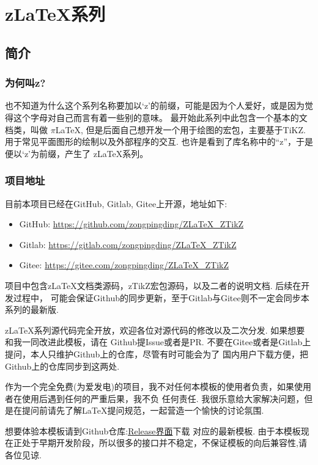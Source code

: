 \chapter{z\LaTeX{}系列}
\section{简介}
\subsection{为何叫z?}
也不知道为什么这个系列名称要加以`z'的前缀，可能是因为个人爱好，或是因为觉得这个字母对自己而言有着一些别的意味。
最开始此系列中此包含一个基本的文档类，叫做 $\pi$\LaTeX{}, 但是后面自己想开发一个用于绘图的宏包，主要基于TiKZ.
用于常见平面图形的绘制以及外部程序的交互. 也许是看到了库名称中的``z''，于是便以`z'为前缀，产生了
z\LaTeX{}系列。


\subsection{项目地址}
目前本项目已经在GitHub, Gitlab, Gitee上开源，地址如下:
\begin{itemize}
    \item GitHub: \href{https://github.com/zongpingding/ZLaTeX_ZTikZ}{https://github.com/zongpingding/ZLaTeX\_ZTikZ}
    \item Gitlab: \href{https://gitlab.com/zongpingding/ZLaTeX_ZTikZ}{https://gitlab.com/zongpingding/ZLaTeX\_ZTikZ}
    \item Gitee:  \href{https://gitee.com/zongpingding/ZLaTeX_ZTikZ}{https://gitee.com/zongpingding/ZLaTeX\_ZTikZ}
\end{itemize}

项目中包含z\LaTeX{}文档类源码，zTikZ宏包源码，以及二者的说明文档. 后续在开发过程中，
可能会保证Github的同步更新，至于Gitlab与Gitee则不一定会同步本系列的最新版.

z\LaTeX{}系列源代码完全开放，欢迎各位对源代码的修改以及二次分发. 如果想要和我一同改进此模板，请在
Github提Issue或者是PR. 不要在Gitee或者是Gitlab上提问，本人只维护Github上的仓库，尽管有时可能会为了
国内用户下载方便，把Github上的仓库同步到这两处. 

作为一个完全免费(为爱发电)的项目，我不对任何本模板的使用者负责，如果使用者在使用后遇到任何的严重后果，我不负
任何责任. 我很乐意给大家解决问题，但是在提问前请先了解\LaTeX{}提问规范，一起营造一个愉快的讨论氛围. 

想要体验本模板请到Github仓库:\href{https://github.com/zongpingding/ZLaTeX_ZTikZ/releases}{Release界面}下载 
对应的最新模板. 由于本模板现在正处于早期开发阶段，所以很多的接口并不稳定，不保证模板的向后兼容性,请各位见谅.

